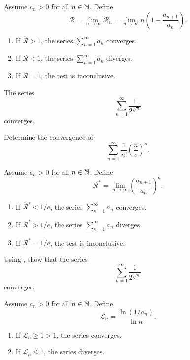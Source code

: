 \begin{proposition}
  Assume $a_n > 0$ for all $n \in \mathbb N$. Define
  \[ \mathcal{R} = \lim_{n \to \infty} \mathcal{R}_n = \lim_{n \to
  \infty} n \left(1 - \frac{a_{n + 1}}{a_n}\right). \]
  \begin{enumerate}
    \item If $\mathcal{R} > 1$, the series $\sum_{n = 1}^{\infty}
      a_n$ converges.
    \item If $\mathcal{R} < 1$, the series $\sum_{n = 1}^{\infty} a_n$ diverges.
    \item If $\mathcal{R} = 1$, the test is inconclusive.
  \end{enumerate}
\end{proposition}

\begin{example}
  The series
  \[ \sum_{n = 1}^{\infty} \frac{1}{2^{\sqrt{n}}} \]
  converges.
\end{example}

\begin{example}
  Determine the convergence of
  \[ \sum_{n = 1}^{\infty} \frac{1}{n!} \left(\frac{n}{e}\right)^n. \]
\end{example}

\begin{proposition}
  Assume $a_n > 0$ for all $n \in \mathbb N$. Define
  \[ \mathcal{R}^\ast = \lim_{n \to \infty} \left(\frac{a_{n +
  1}}{a_n}\right)^n. \]
  \begin{enumerate}
    \item If $\mathcal{R}^\ast < 1/e$, the series $\sum_{n = 1}^{\infty}
      a_n$ converges.
    \item If $\mathcal{R}^\ast > 1/e$, the series $\sum_{n =
      1}^{\infty} a_n$ diverges.
    \item If $\mathcal{R}^\ast = 1/e$, the test is inconclusive.
  \end{enumerate}
\end{proposition}

\begin{example}
  Using , show that the series
  \[ \sum_{n = 1}^{\infty} \frac{1}{2^{\sqrt{n}}} \]
  converges.
\end{example}

\begin{proposition}
  Assume $a_n > 0$ for all $n \in \mathbb N$. Define
  \[ \mathcal{L}_n = \frac{\ln(1/a_n)}{\ln n}. \]
  \begin{enumerate}
    \item If $\mathcal{L}_n \geq 1 > 1$, the series converges.
    \item If $\mathcal{L}_n \leq 1$, the series diverges.
  \end{enumerate}
\end{proposition}

